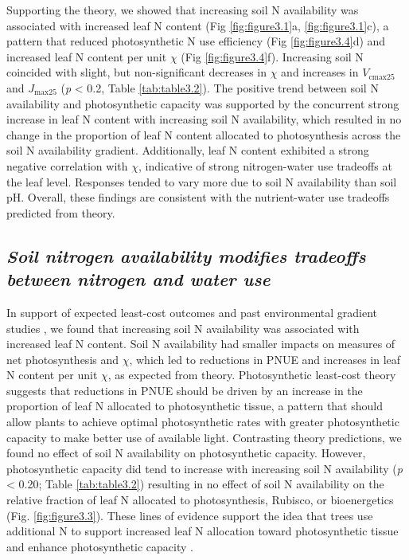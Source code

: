     Supporting the theory, we showed that increasing soil N availability was associated with increased leaf N content (Fig \ref{fig:figure3.1}a, \ref{fig:figure3.1}c), a pattern that reduced photosynthetic N use efficiency (Fig \ref{fig:figure3.4}d) and increased leaf N content per unit $\chi$ (Fig \ref{fig:figure3.4}f). Increasing soil N coincided with slight, but non-significant decreases in $\chi$ and increases in $V_\mathrm{cmax25}$ and $J_\mathrm{max25}$ (\textit{p} < 0.2, Table \ref{tab:table3.2}). The positive trend between soil N availability and photosynthetic capacity was supported by the concurrent strong increase in leaf N content with increasing soil N availability, which resulted in no change in the proportion of leaf N content allocated to photosynthesis across the soil N availability gradient. Additionally, leaf N content exhibited a strong negative correlation with $\chi$, indicative of strong nitrogen-water use tradeoffs at the leaf level. Responses tended to vary more due to soil N availability than soil pH. Overall, these findings are consistent with the nutrient-water use tradeoffs predicted from theory.

    \subsection{\textit{Soil nitrogen availability modifies tradeoffs between nitrogen and water use}}

    In support of expected least-cost outcomes and past environmental gradient studies , we found that increasing soil N availability was associated with increased leaf N content. Soil N availability had smaller impacts on measures of net photosynthesis and $\chi$, which led to reductions in PNUE and increases in leaf N content per unit $\chi$, as expected from theory. Photosynthetic least-cost theory suggests that reductions in PNUE should be driven by an increase in the proportion of leaf N allocated to photosynthetic tissue, a pattern that should allow plants to achieve optimal photosynthetic rates with greater photosynthetic capacity to make better use of available light. Contrasting theory predictions, we found no effect of soil N availability on photosynthetic capacity. However, photosynthetic capacity did tend to increase with increasing soil N availability (\textit{p} < 0.20; Table \ref{tab:table3.2}) resulting in no effect of soil N availability on the relative fraction of leaf N allocated to photosynthesis, Rubisco, or bioenergetics (Fig. \ref{fig:figure3.3}). These lines of evidence support the idea that trees use additional N to support increased leaf N allocation toward photosynthetic tissue and enhance photosynthetic capacity .

